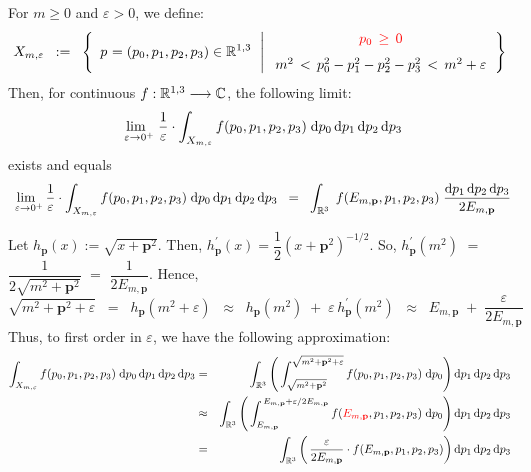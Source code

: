 \begin{lemma}
\mbox{}
\vskip 0.1cm
\noindent
For $m \geq 0$ and $\varepsilon > 0$, we define:
\begin{equation*}
X_{m,\varepsilon}
\;\; := \;\;
	\left\{\;\,
		\overset{{\color{white}-}}{p} = (p_{0},p_{1},p_{2},p_{3}) \in \Re^{1,3}
		\,\;\left\vert\;
		\begin{array}{c}
			{\color{red}p_{0} \,\geq\, 0}
			\\
			\overset{{\color{white}-}}{m^{2}} \,<\, p_{0}^{2} - p_{1}^{2} - p_{2}^{2} - p_{3}^{2} \,<\, m^{2} + \varepsilon
			\end{array}
		\right.
		\right\}
\end{equation*}
Then, for continuous $f : \mathbb{R}^{1,3} \longrightarrow \mathbb{C}$, the following limit:
\begin{equation*}
\underset{{\color{white}..}\varepsilon\rightarrow 0^{+}}{\lim}\;
\dfrac{1}{\varepsilon}
\cdot
\int_{X_{m,\varepsilon}} f(p_{0},p_{1},p_{2},p_{3}) \;\d p_{0}\,\d p_{1}\,\d p_{2}\,\d p_{3} 
\end{equation*}
exists and equals
\begin{equation*}
\underset{{\color{white}..}\varepsilon\rightarrow 0^{+}}{\lim}\,
\dfrac{1}{\varepsilon}
\cdot
\int_{X_{m,\varepsilon}} f(p_{0},p_{1},p_{2},p_{3}) \;\d p_{0}\,\d p_{1}\,\d p_{2}\,\d p_{3}
\;\; = \;\;
	\int_{\Re^{3}}\;
		f(E_{m,\mathbf{p}},p_{1},p_{2},p_{3})
	\;\dfrac{
		\d p_{1}\,\d p_{2}\,\d p_{3} 
		}{
		2 E_{m,\mathbf{p}}
		}
\end{equation*}
\end{lemma}
\proof
Let $h_{\mathbf{p}}(x) := \sqrt{x + \mathbf{p}^{2}}$.
Then, $h^{\prime}_{\mathbf{p}}(x) = \dfrac{1}{2}\left(x + \mathbf{p}^{2}\right)^{-1/2}$.
So, $h^{\prime}_{\mathbf{p}}(m^{2})$ $=$ $\dfrac{1}{2\sqrt{m^{2}+\mathbf{p}^{2}}}$
$=$ $\dfrac{1}{2 E_{m,\mathbf{p}}}$.
Hence,
\begin{equation*}
\sqrt{m^{2}+\mathbf{p}^{2}+\varepsilon}
\;\; = \;\;
	h_{\mathbf{p}}(m^{2}+\varepsilon)
\;\; \approx \;\;
	h_{\mathbf{p}}(m^{2})
	\;+\;
	\varepsilon\,h^{\prime}_{\mathbf{p}}(m^{2})
\;\; \approx \;\;
	E_{m,\mathbf{p}}
	\;+\;
	\dfrac{\varepsilon}{2 E_{m,\mathbf{p}}}
\end{equation*}
Thus, to first order in $\varepsilon$, we have the following approximation:
\begin{eqnarray*}
\int_{X_{m,\varepsilon}} f(p_{0},p_{1},p_{2},p_{3}) \;\textnormal{d} p_{0}\,\textnormal{d} p_{1}\,\textnormal{d} p_{2}\,\textnormal{d} p_{3} 
& = &
	\int_{\mathbb{R}^{3}}
	\left(\,
		\int_{\sqrt{m^{2}+\mathbf{p}^{2}}}^{\sqrt{m^{2}+\mathbf{p}^{2}+\varepsilon}}
		f(p_{0},p_{1},p_{2},p_{3})
		\;\textnormal{d} p_{0}
		\right)
	\textnormal{d} p_{1}\,\textnormal{d} p_{2}\,\textnormal{d} p_{3} 
\\
& \approx &
	\int_{\mathbb{R}^{3}}
	\left(\,
		\int_{E_{m,\mathbf{p}}}^{\,E_{m,\mathbf{p}}+\varepsilon/2E_{m,\mathbf{p}}}
		f({\color{red}E_{m,\mathbf{p}}},p_{1},p_{2},p_{3})
		\;\textnormal{d} p_{0}
		\right)
	\textnormal{d} p_{1}\,\textnormal{d} p_{2}\,\textnormal{d} p_{3} 
\\
& = &
	\int_{\mathbb{R}^{3}}
	\left(\,
		\dfrac{\varepsilon}{2 E_{m,\mathbf{p}}}
		\cdot
		f(E_{m,\mathbf{p}},p_{1},p_{2},p_{3})
		\right)
	\textnormal{d} p_{1}\,\textnormal{d} p_{2}\,\textnormal{d} p_{3} 
\end{eqnarray*}
